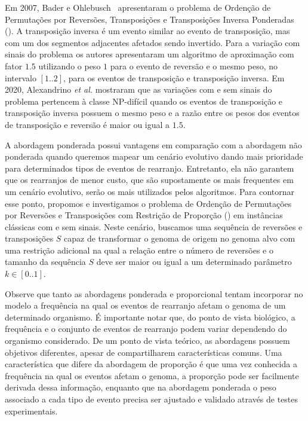 Em 2007, Bader e Ohlebusch~\cite{2007-bader-ohlebusch} apresentaram o problema de Ordenção de Permutações por Reversões, Transposições e Transposições Inversa Ponderadas (\SbWRTIT). A transposição inversa é um evento similar ao evento de transposição, mas com um dos segmentos adjacentes afetados sendo invertido. Para a variação com sinais do problema os autores apresentaram um algoritmo de aproximação com fator $1.5$ utilizando o peso $1$ para o evento de reversão e o mesmo peso, no intervalo $[1..2]$, para os eventos de transposição e transposição inversa. Em 2020, Alexandrino \textit{et al.}\cite{2020b-alexandrino-etal} mostraram que as variações com e sem sinais do problema \SbWRTIT{} pertencem à classe NP-difícil quando os eventos de transposição e transposição inversa possuem o mesmo peso e a razão entre os pesos dos eventos de transposição e reversão é maior ou igual a $1.5$.

A abordagem ponderada possui vantagens em comparação com a abordagem não ponderada quando queremos mapear um cenário evolutivo dando mais prioridade para determinados tipos de eventos de rearranjo. Entretanto, ela não garantem que os rearranjos de menor custo, que são supostamente os mais frequentes em um cenário evolutivo, serão os mais utilizados pelos algoritmos. Para contornar esse ponto, propomos e investigamos o problema de Ordenção de Permutações por Reversões e Transposições com Restrição de Proporção (\SbPRT) em instâncias clássicas com e sem sinais. Neste cenário, buscamos uma sequência de reversões e transposições $S$ capaz de transformar o genoma de origem no genoma alvo com uma restrição adicional na qual a relação entre o número de reversões e o tamanho da sequência $S$ deve ser maior ou igual a um determinado parâmetro $k \in [0..1]$. 

Observe que tanto as abordagens ponderada e proporcional tentam incorporar no modelo a frequência na qual os eventos de rearranjo afetam o genoma de um determinado organismo. É importante notar que, do ponto de vista biológico, a frequência e o conjunto de eventos de rearranjo podem variar dependendo do organismo considerado. De um ponto de vista teórico, as abordagens possuem objetivos diferentes, apesar de compartilharem características comuns. Uma característica que difere da abordagem de proporção é que uma vez conhecida a frequência na qual os eventos afetam o genoma, a proporção pode ser facilmente derivada dessa informação, enquanto que na abordagem ponderada o peso associado a cada tipo de evento precisa ser ajustado e validado através de testes experimentais.

